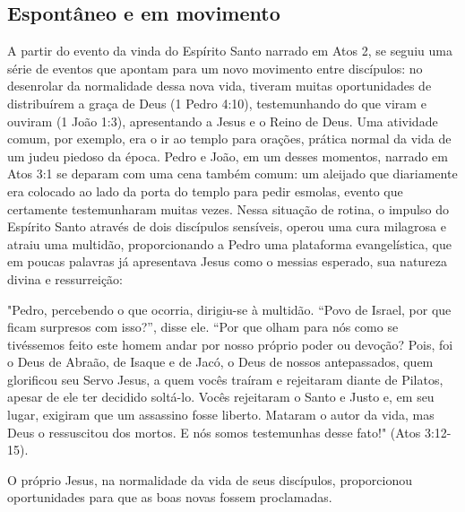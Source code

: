 \documentclass[12pt,openright,oneside,a4paper]{abntex2}
\begin{document}

\subsection{Espontâneo e em movimento}

A partir do evento da vinda do Espírito Santo narrado em Atos 2, se seguiu uma série de eventos que apontam para um novo movimento entre discípulos: no desenrolar da normalidade dessa nova vida, tiveram muitas oportunidades de distribuírem a graça de Deus (1 Pedro 4:10), testemunhando do que viram e ouviram (1 João 1:3), apresentando a Jesus e o Reino de Deus. Uma atividade comum, por exemplo, era o ir ao templo para orações, prática normal da vida de um judeu piedoso da época. Pedro e João, em um desses momentos, narrado em Atos 3:1 se deparam com uma cena também comum: um aleijado que diariamente era colocado ao lado da porta do templo para pedir esmolas, evento que certamente testemunharam muitas vezes. Nessa situação de rotina, o impulso do Espírito Santo através de dois discípulos sensíveis, operou uma cura milagrosa e atraiu uma multidão, proporcionando a Pedro uma plataforma evangelística, que em poucas palavras já apresentava Jesus como o messias esperado, sua natureza divina e ressurreição:

\begin{citacao}
	"Pedro, percebendo o que ocorria, dirigiu-se à multidão. “Povo de Israel, por que ficam surpresos com isso?”, disse ele. “Por que olham para nós como se tivéssemos feito este homem andar por nosso próprio poder ou devoção? Pois, foi o Deus de Abraão, de Isaque e de Jacó, o Deus de nossos antepassados, quem glorificou seu Servo Jesus, a quem vocês traíram e rejeitaram diante de Pilatos,	apesar de ele ter decidido soltá-lo. Vocês rejeitaram o Santo e Justo e, em seu lugar, exigiram que um assassino fosse liberto. Mataram o autor da vida, mas Deus o ressuscitou dos mortos. E nós somos testemunhas desse fato!" (Atos 3:12-15).
\end{citacao}

O próprio Jesus, na normalidade da vida de seus discípulos, proporcionou oportunidades para que as boas novas fossem proclamadas.
\end{document}
